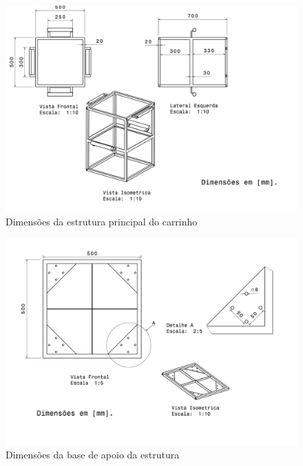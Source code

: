 \begin{figure}[H]
\centering
\includegraphics[scale=0.15]{figuras/caixote.png}
\caption{Dimensões da estrutura principal do carrinho}
\end{figure}

\begin{figure}[H]
\centering
\includegraphics[scale=0.15]{figuras/base.png}
\caption{Dimensões da base de apoio da estrutura}
\end{figure}

